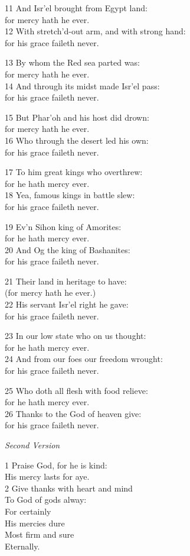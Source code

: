 11 And Isr’el brought from Egypt land:\\
for mercy hath he ever.\\
12 With stretch’d-out arm, and with strong hand:\\
for his grace faileth never.

13 By whom the Red sea parted was:\\
for mercy hath he ever.\\
14 And through its midst made Isr’el pass:\\
for his grace faileth never.

15 But Phar’oh and his host did drown:\\
for mercy hath he ever.\\
16 Who through the desert led his own:\\
for his grace faileth never.

17 To him great kings who overthrew:\\
for he hath mercy ever.\\
18 Yea, famous kings in battle slew:\\
for his grace faileth never.

19 Ev’n Sihon king of Amorites:\\
for he hath mercy ever.\\
20 And Og the king of Bashanites:\\
for his grace faileth never.

21 Their land in heritage to have:\\
(for mercy hath he ever.)\\
22 His servant Isr’el right he gave:\\
for his grace faileth never.

23 In our low state who on us thought:\\
for he hath mercy ever.\\
24 And from our foes our freedom wrought:\\
for his grace faileth never.

25 Who doth all flesh with food relieve:\\
for he hath mercy ever.\\
26 Thanks to the God of heaven give:\\
for his grace faileth never.

\emph{Second Version}

1 Praise God, for he is kind:\\
His mercy lasts for aye.\\
2 Give thanks with heart and mind\\
To God of gods alway:\\
For certainly\\
His mercies dure\\
Most firm and sure\\
Eternally.

